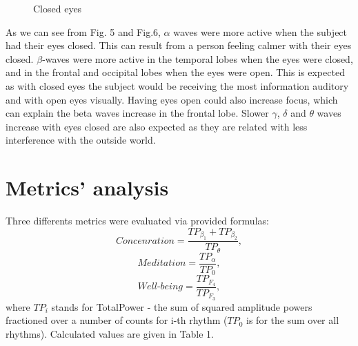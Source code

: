 \documentclass[9pt,twocolumn,twoside]{osajnl}
\begin{document}
\begin{figure}[htbp]
\centering
{}
\caption{Closed eyes}
\label{fig:false-color}
\end{figure}

 As we can see from Fig. 5 and Fig.6, $\alpha$ waves were more active when the subject had their eyes closed. This can result from a person feeling calmer with their eyes closed. $\beta$-waves were more active in the temporal lobes when the eyes were closed, and in the frontal and occipital lobes when the eyes were open. This is expected as with closed eyes the subject would be receiving the most information auditory and with open eyes visually. Having eyes open could also increase focus, which can explain the beta waves increase in the frontal lobe. Slower $\gamma$, $\delta$ and $\theta$ waves increase with eyes closed are also expected as they are related with less interference with the outside world.



\section{Metrics' analysis}

Three differents metrics were evaluated via provided formulas:
\begin{equation}
    Concenration = \frac{TP_{\beta_1} + TP_{\beta_2}}{TP_{\theta}},
\end{equation}
\begin{equation}
    Meditation = \frac{TP_{\alpha}}{TP_{0}},
\end{equation}
\begin{equation}
    Well\text{-}being = \frac{TP_{F_4}}{TP_{F_3}},
\end{equation}
where $TP_i$ stands for TotalPower - the sum of squared amplitude powers fractioned over a number of counts for i-th rhythm ($TP_0$ is for the sum over all rhythms). Calculated values are given in Table 1.
\end{document}
